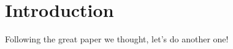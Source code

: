 \section{Introduction}
Following the great paper \cite{feld2018hybrid} we thought, let's do another one!


